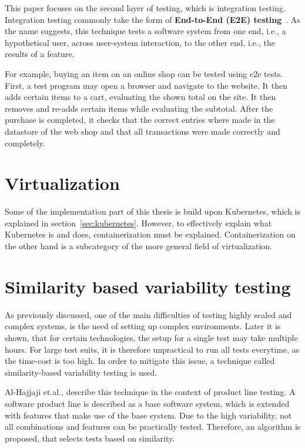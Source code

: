 This paper focuses on the second layer of testing, which is integration testing.
Integration testing commonly take the form of \textbf{End-to-End (E2E) testing}~\cite{end-to-end-integration-testing-design}.
As the name suggests, this technique tests a software system from one end, i.e., a hypothetical user, across user-system interaction, to the other end, i.e., the results of a feature.

For example, buying an item on an online shop can be tested using e2e tests.
First, a test program may open a browser and navigate to the website.
It then adds certain items to a cart, evaluating the shown total on the site.
It then removes and re-adds certain items while evaluating the subtotal.
After the purchase is completed, it checks that the correct entries where made in the datastore of the web shop and that all transactions were made correctly and completely.

\section{Virtualization}\label{sec:virtualization}

Some of the implementation part of this thesis is build upon Kubernetes, which is explained in section~\ref{sec:kubernetes}.
However, to effectively explain what Kubernetes is and does, containerization must be explained.
Containerization on the other hand is a subcategory of the more general field of virtualization.



\section{Similarity based variability testing}\label{sec:similarities}
As previously discussed, one of the main difficulties of testing highly scaled and complex systems, is the need of setting up complex environments.
Later it is shown, that for certain technologies, the setup for a single test may take multiple hours.
For large test suits, it is therefore unpractical to run all tests everytime, as the time-cost is too high.
In order to mitigate this issue, a technique called similarity-based variability testing is used.

Al-Hajjaji et.al., describe this technique in the context of product line testing\cite{SimilarityBasedPrioritizationInSoftwareProductLineTesting}.
A software product line is described as a base software system, which is extended with features that make use of the base system.
Due to the high variability, not all combinations and features can be practically tested.
Therefore, an algorithm is proposed, that selects tests based on similarity.

